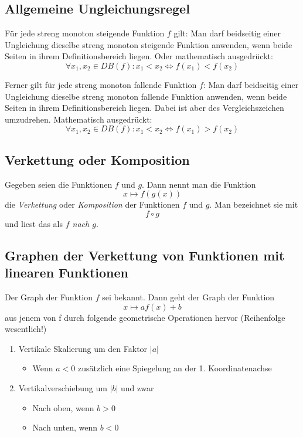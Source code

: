 \subsection{Allgemeine Ungleichungsregel}

Für jede streng monoton steigende Funktion $f$ gilt: Man darf beidseitig einer Ungleichung dieselbe
streng monoton steigende Funktion anwenden, wenn beide Seiten in ihrem Definitionsbereich liegen.
Oder mathematisch ausgedrückt:
%
\begin{displaymath}
	\forall x_1, x_2 \in DB(f): x_1 < x_2 \Leftrightarrow f(x_1) < f(x_2)
\end{displaymath}

Ferner gilt für jede streng monoton fallende Funktion $f$: Man darf beidseitig einer Ungleichung
dieselbe streng monoton fallende Funktion anwenden, wenn beide Seiten in ihrem Definitionsbereich
liegen. Dabei ist aber des Vergleichszeichen umzudrehen. Mathematisch ausgedrückt:
%
\begin{displaymath}
	\forall x_1, x_2 \in DB(f): x_1 < x_2 \Leftrightarrow f(x_1) > f(x_2)
\end{displaymath}


\subsection{Verkettung oder Komposition}

Gegeben seien die Funktionen $f$ und $g$. Dann nennt man die Funktion
%
\begin{displaymath}
	x \mapsto f(g(x))
\end{displaymath}
%
die \textit{Verkettung} oder \textit{Komposition} der Funktionen $f$ und $g$. Man bezeichnet sie mit
%
\begin{displaymath}
	f \circ g
\end{displaymath}
%
und liest das als \textit{$f$ nach $g$}.


\subsection{Graphen der Verkettung von Funktionen mit linearen Funktionen}

Der Graph der Funktion $f$ sei bekannt. Dann geht der Graph der Funktion
%
\begin{displaymath}
	x \mapsto af(x) + b
\end{displaymath}
%
aus jenem von f durch folgende geometrische Operationen hervor (Reihenfolge wesentlich!)
\begin{enumerate}
	\item Vertikale Skalierung um den Faktor $|a|$
	\begin{itemize}
		\item Wenn $a < 0$ zusätzlich eine Spiegelung an der 1. Koordinatenachse
	\end{itemize}
	\item Vertikalverschiebung um $|b|$ und zwar
	\begin{itemize}
		\item Nach oben, wenn $b > 0$
		\item Nach unten, wenn $b < 0$
	\end{itemize}
\end{enumerate}

